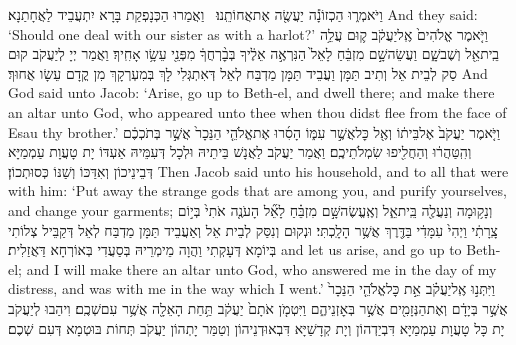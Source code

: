 {וַיֹּאמְר֑וּ הַכְזוֹנָ֕ה יַעֲשֶׂ֖ה אֶת\maqqaf אֲחוֹתֵֽנוּ׃ \petucha }
{וַאֲמַרוּ הַכְּנָפְקַת בָּרָא יִתְעֲבֵיד לַאֲחָתַנָא׃}
{And they said: ‘Should one deal with our sister as with a harlot?’}{}
\newperek
{}%
{וַיֹּ֤אמֶר אֱלֹהִים֙ אֶֽל\maqqaf יַעֲקֹ֔ב ק֛וּם עֲלֵ֥ה בֵֽית\maqqaf אֵ֖ל וְשֶׁב\maqqaf שָׁ֑ם וַעֲשֵׂה\maqqaf שָׁ֣ם מִזְבֵּ֔חַ לָאֵל֙ הַנִּרְאֶ֣ה אֵלֶ֔יךָ בְּבׇ֨רְחֲךָ֔ מִפְּנֵ֖י עֵשָׂ֥ו אָחִֽיךָ׃}
{וַאֲמַר יְיָ לְיַעֲקֹב קוּם סַק לְבֵית אֵל וְתִיב תַּמָּן וַעֲבֵיד תַּמָּן מַדְבַּח לְאֵל דְּאִתְגְּלִי לָךְ בְּמִעְרְקָךְ מִן קֳדָם עֵשָׂו אֲחוּךְ׃}
{And God said unto Jacob: ‘Arise, go up to Beth-el, and dwell there; and make there an altar unto God, who appeared unto thee when thou didst flee from the face of Esau thy brother.’}{}
{וַיֹּ֤אמֶר יַעֲקֹב֙ אֶל\maqqaf בֵּית֔וֹ וְאֶ֖ל כׇּל\maqqaf אֲשֶׁ֣ר עִמּ֑וֹ הָסִ֜רוּ אֶת\maqqaf אֱלֹהֵ֤י הַנֵּכָר֙ אֲשֶׁ֣ר בְּתֹכְכֶ֔ם וְהִֽטַּהֲר֔וּ וְהַחֲלִ֖יפוּ שִׂמְלֹתֵיכֶֽם׃}
{וַאֲמַר יַעֲקֹב לַאֲנָשׁ בֵּיתֵיהּ וּלְכָל דְּעִמֵּיהּ אַעְדּוֹ יָת טָעֲוָת עַמְמַיָּא דְּבֵינֵיכוֹן וְאִדַּכּוֹ וְשַׁנּוֹ כְּסוּתְכוֹן׃}
{Then Jacob said unto his household, and to all that were with him: ‘Put away the strange gods that are among you, and purify yourselves, and change your garments;}{}
{וְנָק֥וּמָה וְנַעֲלֶ֖ה בֵּֽית\maqqaf אֵ֑ל וְאֶֽעֱשֶׂה\maqqaf שָּׁ֣ם מִזְבֵּ֗חַ לָאֵ֞ל הָעֹנֶ֤ה אֹתִי֙ בְּי֣וֹם צָֽרָתִ֔י וַיְהִי֙ עִמָּדִ֔י בַּדֶּ֖רֶךְ אֲשֶׁ֥ר הָלָֽכְתִּי׃}
{וּנְקוּם וְנִסַּק לְבֵית אֵל וְאַעֲבֵיד תַּמָּן מַדְבַּח לְאֵל דְּקַבֵּיל צְלוֹתִי בְּיוֹמָא דְּעָקְתִי וַהֲוָה מֵימְרֵיהּ בְּסַעֲדִי בְּאוֹרְחָא דַּאֲזַלִית׃}
{and let us arise, and go up to Beth-el; and I will make there an altar unto God, who answered me in the day of my distress, and was with me in the way which I went.’}{}
{וַיִּתְּנ֣וּ אֶֽל\maqqaf יַעֲקֹ֗ב אֵ֣ת כׇּל\maqqaf אֱלֹהֵ֤י הַנֵּכָר֙ אֲשֶׁ֣ר בְּיָדָ֔ם וְאֶת\maqqaf הַנְּזָמִ֖ים אֲשֶׁ֣ר בְּאׇזְנֵיהֶ֑ם וַיִּטְמֹ֤ן אֹתָם֙ יַעֲקֹ֔ב תַּ֥חַת הָאֵלָ֖ה אֲשֶׁ֥ר עִם\maqqaf שְׁכֶֽם׃}
{וִיהַבוּ לְיַעֲקֹב יָת כָּל טָעֲוָת עַמְמַיָּא דִּבְיַדְהוֹן וְיָת קְדָשַׁיָּא דִּבְאוּדְנֵיהוֹן וְטַמַּר יָתְהוֹן יַעֲקֹב תְּחוֹת בּוּטְמָא דְּעִם שְׁכֶם׃}
